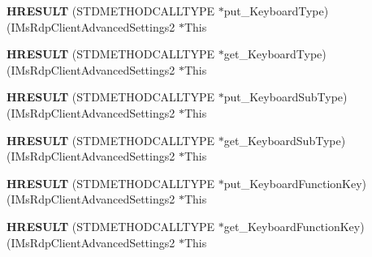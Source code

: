 \begin{DoxyCompactItemize}
\item 
\mbox{\label{struct_i_ms_rdp_client_advanced_settings2_vtbl_ad4c42e444abd02bdb761544d3322f7eb}} 
{\bfseries H\+R\+E\+S\+U\+LT} (S\+T\+D\+M\+E\+T\+H\+O\+D\+C\+A\+L\+L\+T\+Y\+PE $\ast$put\+\_\+\+Keyboard\+Type)(I\+Ms\+Rdp\+Client\+Advanced\+Settings2 $\ast$This
\item 
\mbox{\label{struct_i_ms_rdp_client_advanced_settings2_vtbl_a0be5d3db3fbb346392391b47c43430ca}} 
{\bfseries H\+R\+E\+S\+U\+LT} (S\+T\+D\+M\+E\+T\+H\+O\+D\+C\+A\+L\+L\+T\+Y\+PE $\ast$get\+\_\+\+Keyboard\+Type)(I\+Ms\+Rdp\+Client\+Advanced\+Settings2 $\ast$This
\item 
\mbox{\label{struct_i_ms_rdp_client_advanced_settings2_vtbl_ac35a2776ddf7686c3ffdac63ed85fa91}} 
{\bfseries H\+R\+E\+S\+U\+LT} (S\+T\+D\+M\+E\+T\+H\+O\+D\+C\+A\+L\+L\+T\+Y\+PE $\ast$put\+\_\+\+Keyboard\+Sub\+Type)(I\+Ms\+Rdp\+Client\+Advanced\+Settings2 $\ast$This
\item 
\mbox{\label{struct_i_ms_rdp_client_advanced_settings2_vtbl_a63e886cfa7181cac91285734b154af1f}} 
{\bfseries H\+R\+E\+S\+U\+LT} (S\+T\+D\+M\+E\+T\+H\+O\+D\+C\+A\+L\+L\+T\+Y\+PE $\ast$get\+\_\+\+Keyboard\+Sub\+Type)(I\+Ms\+Rdp\+Client\+Advanced\+Settings2 $\ast$This
\item 
\mbox{\label{struct_i_ms_rdp_client_advanced_settings2_vtbl_a11c29737c6cccc4294bcdeca0dc1dc0b}} 
{\bfseries H\+R\+E\+S\+U\+LT} (S\+T\+D\+M\+E\+T\+H\+O\+D\+C\+A\+L\+L\+T\+Y\+PE $\ast$put\+\_\+\+Keyboard\+Function\+Key)(I\+Ms\+Rdp\+Client\+Advanced\+Settings2 $\ast$This
\item 
\mbox{\label{struct_i_ms_rdp_client_advanced_settings2_vtbl_aa5f414e0bee099271d13b8b711872a7d}} 
{\bfseries H\+R\+E\+S\+U\+LT} (S\+T\+D\+M\+E\+T\+H\+O\+D\+C\+A\+L\+L\+T\+Y\+PE $\ast$get\+\_\+\+Keyboard\+Function\+Key)(I\+Ms\+Rdp\+Client\+Advanced\+Settings2 $\ast$This
\item 
\mbox{\label{struct_i_ms_rdp_client_advanced_settings2_vtbl_ad6ef3ca8d4481be94b7eb0ce1689ac35}} 

\end{DoxyCompactItemize}
